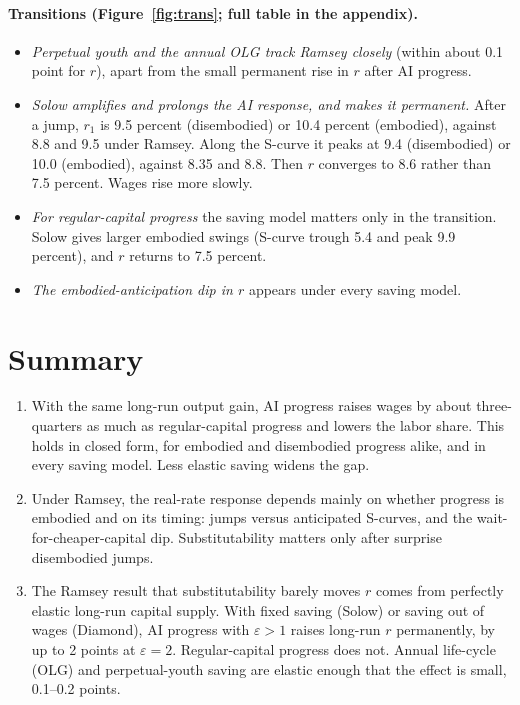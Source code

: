 \documentclass[11pt]{article}
\newcommand{\e}{\varepsilon}
\begin{document}
\paragraph{Transitions (Figure~\ref{fig:trans}; full table in the appendix).}
\begin{itemize}
\item \emph{Perpetual youth and the annual OLG track Ramsey closely} (within about 0.1 point
for $r$), apart from the small permanent rise in $r$ after AI progress.
\item \emph{Solow amplifies and prolongs the AI response, and makes it permanent.} After
a jump, $r_1$ is 9.5 percent (disembodied) or 10.4 percent (embodied), against 8.8 and 9.5
under Ramsey. Along the S-curve it peaks at 9.4 (disembodied) or 10.0 (embodied), against
8.35 and 8.8. Then $r$ converges to 8.6 rather than 7.5 percent. Wages rise more slowly.
\item \emph{For regular-capital progress} the saving model matters only in the transition.
Solow gives larger embodied swings (S-curve trough 5.4 and peak 9.9 percent), and $r$
returns to 7.5 percent.
\item \emph{The embodied-anticipation dip in $r$} appears under every saving model.
\end{itemize}

\section{Summary}

\begin{enumerate}
\item With the same long-run output gain, AI progress raises wages by about three-quarters as much as
regular-capital progress and lowers the labor share. This holds in closed form, for
embodied and disembodied progress alike, and in every saving model. Less elastic saving
widens the gap.
\item Under Ramsey, the real-rate response depends mainly on whether progress is embodied and
on its timing: jumps versus anticipated S-curves, and the wait-for-cheaper-capital
dip. Substitutability matters only after surprise disembodied jumps.
\item The Ramsey result that substitutability barely moves $r$ comes from perfectly
elastic long-run capital supply. With fixed saving (Solow) or saving out of wages
(Diamond), AI progress with $\e>1$ raises long-run $r$ permanently, by up to 2 points at
$\e=2$. Regular-capital progress does not. Annual life-cycle (OLG) and perpetual-youth
saving are elastic enough that the effect is small, 0.1--0.2 points.
\end{enumerate}
\end{document}
